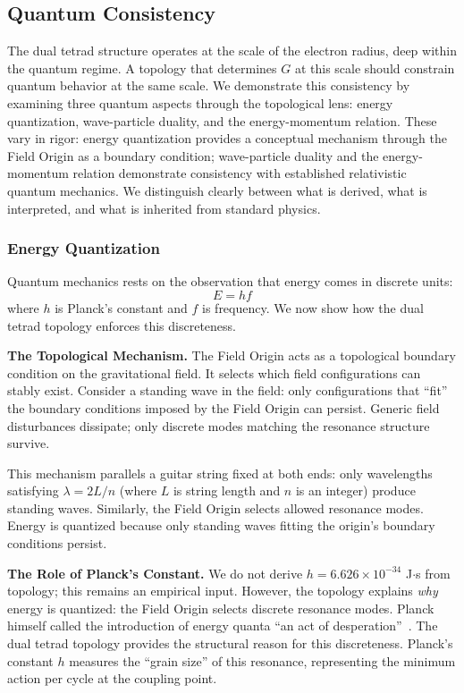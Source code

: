 \documentclass[aps,prd,preprint,superscriptaddress,showpacs,preprintnumbers,amsmath,amssymb,nofootinbib]{revtex4-2}
\begin{document}
\subsection{Quantum Consistency}
\label{subsec:quantum}

The dual tetrad structure operates at the scale of the electron radius, deep within the quantum regime. A topology that determines $G$ at this scale should constrain quantum behavior at the same scale. We demonstrate this consistency by examining three quantum aspects through the topological lens: energy quantization, wave-particle duality, and the energy-momentum relation. These vary in rigor: energy quantization provides a conceptual mechanism through the Field Origin as a boundary condition; wave-particle duality and the energy-momentum relation demonstrate consistency with established relativistic quantum mechanics. We distinguish clearly between what is derived, what is interpreted, and what is inherited from standard physics.

\subsubsection*{Energy Quantization}

Quantum mechanics rests on the observation that energy comes in discrete units:
\begin{equation}
E = hf
\label{eq:energy_quantization}
\end{equation}
where $h$ is Planck's constant and $f$ is frequency. We now show how the dual tetrad topology enforces this discreteness.

\textbf{The Topological Mechanism.}
The Field Origin acts as a topological boundary condition on the gravitational field. It selects which field configurations can stably exist. Consider a standing wave in the field: only configurations that ``fit'' the boundary conditions imposed by the Field Origin can persist. Generic field disturbances dissipate; only discrete modes matching the resonance structure survive.

This mechanism parallels a guitar string fixed at both ends: only wavelengths satisfying $\lambda = 2L/n$ (where $L$ is string length and $n$ is an integer) produce standing waves. Similarly, the Field Origin selects allowed resonance modes. Energy is quantized because only standing waves fitting the origin's boundary conditions persist.

\textbf{The Role of Planck's Constant.}
We do not derive $h = 6.626 \times 10^{-34}$ J$\cdot$s from topology; this remains an empirical input. However, the topology explains \emph{why} energy is quantized: the Field Origin selects discrete resonance modes. Planck himself called the introduction of energy quanta ``an act of desperation''~\cite{planck1931}. The dual tetrad topology provides the structural reason for this discreteness. Planck's constant $h$ measures the ``grain size'' of this resonance, representing the minimum action per cycle at the coupling point.
\end{document}
